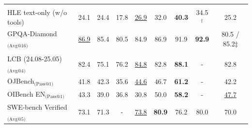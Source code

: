 \begin{table}[t]
{\begin{tabular}{@{}l| c c c c c c c c@{}}
\midrule
\rowcolor{mygray}
\multicolumn{9}{c}{\textit{General QA}} \\
HLE text-only (w/o tools) & 24.1 & 24.4 & 17.8 & \underline{26.9} & 32.0 & \textbf{40.3} & 34.5$^\dagger$ & 25.2 \\
GPQA-Diamond$_\text{(Avg@16)}$ & \underline{86.9} & 85.4 & 80.5 & 84.9 & 86.9 & 91.9 & \textbf{92.9} & 80.5 / 85.2$\ddagger$ \\

\midrule
\rowcolor{mygray}
\multicolumn{9}{c}{\textit{Coding}} \\
LCB (24.08-25.05)$_\text{(Avg@4)}$ & 82.4 & 75.1 & 76.2 & \underline{84.8} & 82.8 & \textbf{88.1} & - & 82.8 \\
OJBench$_\text{(Pass@1)}$ & 41.8 & 42.3 & 35.6 & \underline{44.6} & 46.7 & \textbf{61.2} & - & 42.2 \\
OIBench EN$_\text{(Pass@1)}$ & 43.3 & 39.0 & 36.8 & 30.8 & 50.0 & \textbf{58.2} & - & \underline{47.7} \\
SWE-bench Verified$_\text{(Avg@5)}$ & 73.1 & 71.3 & - & \underline{73.8} & \textbf{80.9} & 76.2 & 80.0 & 70.0 \\


\bottomrule
\end{tabular}
}
\end{table}
